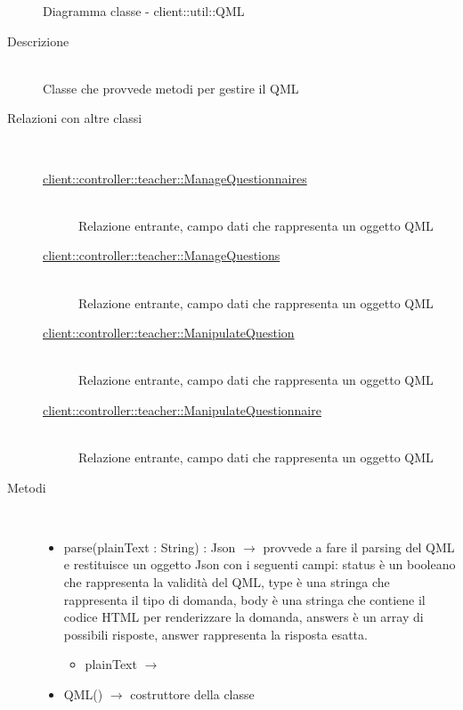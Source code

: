 \begin{figure}[H]
	\centering
	\caption{Diagramma classe - client::util::QML}
\end{figure}\begin{description}
\item[Descrizione] \hfill \\
Classe che provvede metodi per gestire il QML
\item[Relazioni con altre classi] \hfill \\
\vspace{-7mm}
\begin{description}
	\item[\hyperlink{client::controller::teacher::ManageQuestionnaires}{client::controller::teacher::ManageQuestionnaires}] \hfill \\
	Relazione entrante, campo dati che rappresenta un oggetto QML
	\item[\hyperlink{client::controller::teacher::ManageQuestions}{client::controller::teacher::ManageQuestions}] \hfill \\
	Relazione entrante, campo dati che rappresenta un oggetto QML
	\item[\hyperlink{client::controller::teacher::ManipulateQuestion}{client::controller::teacher::ManipulateQuestion}] \hfill \\
	Relazione entrante, campo dati che rappresenta un oggetto QML
	\item[\hyperlink{client::controller::teacher::ManipulateQuestionnaire}{client::controller::teacher::ManipulateQuestionnaire}] \hfill \\
	Relazione entrante, campo dati che rappresenta un oggetto QML
\end{description}

\item[Metodi] \hfill \\
\vspace{-7mm}
\begin{itemize}
	\item parse(plainText : String) : Json $\rightarrow$ provvede a fare il parsing del QML e restituisce un oggetto Json con i seguenti campi: status è un booleano che rappresenta la validità del QML, type è una stringa che rappresenta il tipo di domanda, body è una stringa che contiene il codice HTML per renderizzare la domanda, answers è un array di possibili risposte, answer rappresenta la risposta esatta.\begin{itemize}
		\item plainText $\rightarrow$ 
	\end{itemize}
	
	\item QML() $\rightarrow$ costruttore della classe
\end{itemize}

\end{description}

